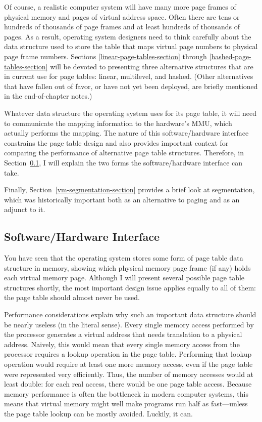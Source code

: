 Of course, a realistic computer system will have many more page frames
of physical memory and pages of virtual address space.  Often there
are tens or hundreds of thousands of page frames and at least
hundreds of thousands of pages.  As a result, operating system
designers need to think carefully about the data structure used to
store the table that maps virtual page numbers to physical page frame
numbers.  Sections \ref{linear-page-tables-section} through \ref{hashed-page-tables-section} will be devoted to presenting three
alternative structures that are in current use for page tables:
linear, multilevel, and hashed.  (Other alternatives that have fallen
out of favor, or have not yet been deployed, are briefly mentioned in
the end-of-chapter notes.)

Whatever data structure the operating system uses for its page table,
it will need to communicate the mapping information to the hardware's
MMU, which actually performs the mapping.  The nature of this
software/hardware interface constrains the page table design and also
provides important context for comparing the performance of
alternative page table structures.  Therefore, in
Section~\ref{vm-hw-sw-interface}, I will explain the two
forms the software/hardware interface can take.

Finally, Section~\ref{vm-segmentation-section} provides a brief look at segmentation, which was
historically important both as an alternative to paging and as an
adjunct to it.

\subsection{Software/Hardware Interface}\label{vm-hw-sw-interface}

You have seen that the operating system stores some form of page table
data structure in memory, showing which physical memory page frame (if
any) holds each virtual memory page.  Although I will present
several possible page table structures shortly, the most important
design issue applies equally to all of them: the page table should
almost never be used.

Performance considerations explain why such an important data
structure should be nearly useless (in the literal sense).  Every
single memory access performed by the processor generates a virtual
address that needs translation to a physical address.  Naively, this
would mean that every single memory access from the processor requires
a lookup operation in the page table.  Performing that lookup
operation would require at least one more memory access, even if the
page table were represented very efficiently.  Thus, the number of
memory accesses would at least double: for each real access, there
would be one page table access.  Because memory performance is often the
bottleneck in modern computer systems, this means that virtual memory
might well make programs run half as fast---unless the page table
lookup can be mostly avoided.  Luckily, it can.

